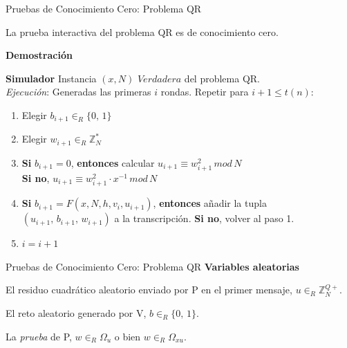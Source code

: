 \documentclass{beamer}
\begin{document}
\begin{frame}{Pruebas de Conocimiento Cero: Problema QR}
	\begin{theorem}
		La prueba interactiva del problema QR es de conocimiento cero.
	\end{theorem}
	\textbf{Demostración}
	
	\textbf{Simulador} Instancia $(x,N)$ $Verdadera$ del problema QR.\\
	\textit{Ejecución}: Generadas las primeras $i$ rondas. Repetir para $i+1 \leq t(n)$:
	
	\begin{enumerate}
		\item Elegir $b_{i+1} \in_R \{0,\,1\}$
		
		\item Elegir $w_{i+1} \in_R \mathbb{Z}^*_N$
		
		\item \textbf{Si} $b_{i+1} = 0$, \textbf{entonces} calcular \qquad $u_{i+1} \equiv w_{i+1}^2 \, mod \,  N$ \\
		\textbf{Si no}, \qquad \qquad \qquad \qquad \qquad \qquad \: $u_{i+1} \equiv w_{i+1}^2 \cdot x^{-1} \, mod \,  N$
		
		\item \textbf{Si} $b_{i+1} = F(x,N,h,v_i,u_{i+1})$, \textbf{entonces} añadir la tupla \\ $(u_{i+1},\,b_{i+1},\,w_{i+1})$ a la transcripción. \textbf{Si no}, volver al paso 1.
		
		\item $i = i+1$
		
	\end{enumerate}
\end{frame}


\begin{frame}{Pruebas de Conocimiento Cero: Problema QR}
	\textbf{Variables aleatorias}
	\begin{description}[Wi]
	\item[$U_i$] El residuo cuadrático aleatorio enviado por P en el primer mensaje, $u \in_R \mathbb{Z}^{Q+}_N$.
	
	\item[$B_i$] El reto aleatorio generado por V, $b \in_R \{0,\,1\}$.
	
	\item[$W_i$] La \textit{prueba} de P, $w \in_R \Omega_u$ o bien $w \in_R \Omega_{xu}$.
\end{description}
\end{frame}
\end{document}
